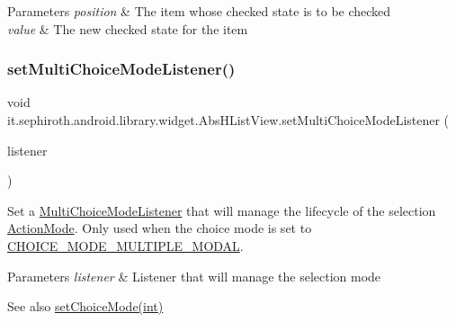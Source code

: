\begin{DoxyParams}{Parameters}
{\em position} & The item whose checked state is to be checked \\
\hline
{\em value} & The new checked state for the item \\
\hline
\end{DoxyParams}
\mbox{\label{classit_1_1sephiroth_1_1android_1_1library_1_1widget_1_1_abs_h_list_view_aa4e373a73a002685779bef5bc216d65c}} 
\subsubsection{\texorpdfstring{set\+Multi\+Choice\+Mode\+Listener()}{setMultiChoiceModeListener()}}
{\footnotesize\ttfamily void it.\+sephiroth.\+android.\+library.\+widget.\+Abs\+H\+List\+View.\+set\+Multi\+Choice\+Mode\+Listener (\begin{DoxyParamCaption}\item[{\hyperlink{interfaceit_1_1sephiroth_1_1android_1_1library_1_1util_1_1v11_1_1_multi_choice_mode_listener}{Multi\+Choice\+Mode\+Listener}}]{listener }\end{DoxyParamCaption})}

Set a \hyperlink{}{Multi\+Choice\+Mode\+Listener} that will manage the lifecycle of the selection \hyperlink{}{Action\+Mode}. Only used when the choice mode is set to \hyperlink{}{C\+H\+O\+I\+C\+E\+\_\+\+M\+O\+D\+E\+\_\+\+M\+U\+L\+T\+I\+P\+L\+E\+\_\+\+M\+O\+D\+AL}.


\begin{DoxyParams}{Parameters}
{\em listener} & Listener that will manage the selection mode\\
\hline
\end{DoxyParams}
\begin{DoxySeeAlso}{See also}
\hyperlink{classit_1_1sephiroth_1_1android_1_1library_1_1widget_1_1_abs_h_list_view_aac2532ddba38bddaecf4a009a9aa96fb}{set\+Choice\+Mode(int)} 
\end{DoxySeeAlso}
\mbox{\label{classit_1_1sephiroth_1_1android_1_1library_1_1widget_1_1_abs_h_list_view_af975c9d302a0d511ddb79a59d2ba7ef2}} 
